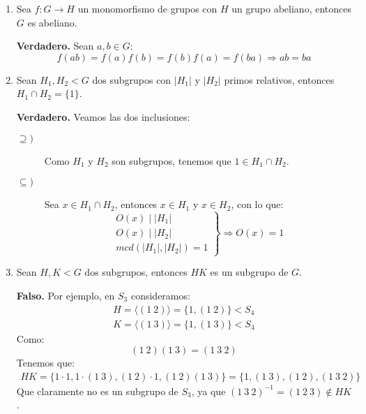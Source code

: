 \documentclass[12pt]{article}
\begin{document}
\begin{ejercicio}
\begin{enumerate}
            \item Sea $f:G\to H$ un monomorfismo de grupos con $H$ un grupo abeliano, entonces $G$ es abeliano.

                \textbf{Verdadero.} Sean $a,b\in G$:
                \begin{equation*}
                    f(ab) = f(a)f(b) = f(b)f(a) = f(ba) \Longrightarrow ab = ba
                \end{equation*}
            \item Sean $H_1,H_2<G$ dos subgrupos con $|H_1|$ y $|H_2|$ primos relativos, entonces $H_1\cap H_2 = \{1\}$.

                \textbf{Verdadero.} Veamos las dos inclusiones:
                \begin{description}
                    \item [$\supseteq)$] Como $H_1$ y $H_2$ son subgrupos, tenemos que $1\in H_1\cap H_2$.
                    \item [$\subseteq)$] Sea $x\in H_1\cap H_2$, entonces $x\in H_1$ y $x\in H_2$, con lo que:
                        \begin{equation*}
                            \left.\begin{array}{r}
                                O(x) \mid |H_1| \\
                                O(x) \mid |H_2| \\
                                mcd(|H_1|,|H_2|) = 1
                            \end{array}\right\} \Longrightarrow  O(x) = 1
                        \end{equation*}
                \end{description}
            \item Sean $H,K<G$ dos subgrupos, entonces $HK$ es un subgrupo de $G$.

                \textbf{Falso.} Por ejemplo, en $S_3$ consideramos:
                \begin{gather*}
                    H = \langle (1\ 2) \rangle = \{1, (1\ 2)\} < S_4 \\
                    K = \langle (1\ 3) \rangle  = \{1, (1\ 3)\} < S_4
                \end{gather*}
                Como:
                \begin{equation*}
                    (1\ 2)(1\ 3) = (1\ 3\ 2) 
                \end{equation*}
                Tenemos que:
                \begin{align*}
                    HK = \{1\cdot 1, 1\cdot (1\ 3), (1\ 2)\cdot 1, (1\ 2)(1\ 3) \} = \{1, (1\ 3),(1\ 2),  (1\ 3\ 2)\}
                \end{align*}
                Que claramente no es un subgrupo de $S_3$, ya que ${(1\ 3\ 2)}^{-1} = (1\ 2\ 3) \notin HK$.


\end{enumerate}
\end{ejercicio}
\end{document}
